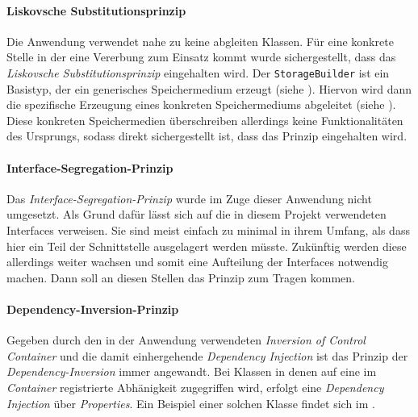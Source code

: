 \paragraph{Liskovsche Substitutionsprinzip}

Die Anwendung verwendet nahe zu keine abgleiten Klassen.
Für eine konkrete Stelle in der eine Vererbung zum Einsatz kommt wurde sichergestellt, dass das \emph{Liskovsche Substitutionsprinzip} eingehalten wird.
Der \texttt{StorageBuilder} ist ein Basistyp, der ein generisches Speichermedium erzeugt (siehe ).
Hiervon wird dann die spezifische Erzeugung eines konkreten Speichermediums abgeleitet (siehe ).
Diese konkreten Speichermedien überschreiben allerdings keine Funktionalitäten des Ursprungs, sodass direkt sichergestellt ist, dass das Prinzip eingehalten wird.

\bgroup

    \label{lst:storage_builder}
\egroup

\bgroup

    \label{lst:volume_builder}
\egroup

\newpage

\paragraph{Interface-Segregation-Prinzip}

Das \emph{Interface-Segregation-Prinzip} wurde im Zuge dieser Anwendung nicht umgesetzt.
Als Grund dafür lässt sich auf die in diesem Projekt verwendeten Interfaces verweisen.
Sie sind meist einfach zu minimal in ihrem Umfang, als dass hier ein Teil der Schnittstelle ausgelagert werden müsste.
Zukünftig werden diese allerdings weiter wachsen und somit eine Aufteilung der Interfaces notwendig machen.
Dann soll an diesen Stellen das Prinzip zum Tragen kommen.

\paragraph{Dependency-Inversion-Prinzip}

Gegeben durch den in der Anwendung verwendeten \emph{Inversion of Control Container} und die damit einhergehende \emph{Dependency Injection} ist das Prinzip der \emph{Dependency-Inversion} immer angewandt.
Bei Klassen in denen auf eine im \emph{Container} registrierte Abhänigkeit zugegriffen wird, erfolgt eine \emph{Dependency Injection} über \emph{Properties}.
Ein Beispiel einer solchen Klasse findet sich im .

